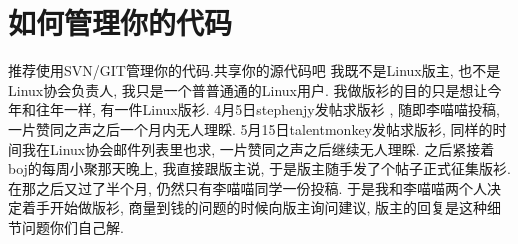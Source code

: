 \section{如何管理你的代码}
推荐使用SVN/GIT管理你的代码.共享你的源代码吧
我既不是Linux版主, 也不是Linux协会负责人, 我只是一个普普通通的Linux用户. 我做版衫的目的只是想让今年和往年一样, 有一件Linux版衫. 4月5日stephenjy发帖求版衫 , 随即李喵喵投稿, 一片赞同之声之后一个月内无人理睬. 5月15日talentmonkey发帖求版衫, 同样的时间我在Linux协会邮件列表里也求, 一片赞同之声之后继续无人理睬. 之后紧接着boj的每周小聚那天晚上, 我直接跟版主说, 于是版主随手发了个帖子正式征集版衫. 在那之后又过了半个月, 仍然只有李喵喵同学一份投稿. 于是我和李喵喵两个人决定着手开始做版衫, 商量到钱的问题的时候向版主询问建议, 版主的回复是这种细节问题你们自己解.
